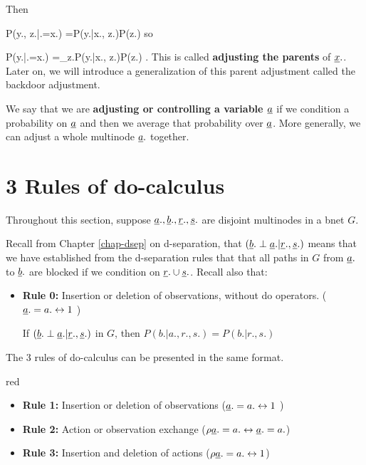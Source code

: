 Then

\beq
P(y., z.|\rho \rvx.=x.)
=P(y.|x., z.)P(z.)
\eeq
so

\beq
P(y.|\rho \rvx.=x.)
=\sum_{z.}P(y.|x., z.)P(z.)
\;.
\eeq
This is called
{\bf adjusting the parents}
of ${\underline{x}}.$.
Later on,
we will introduce 
a generalization
of 
this parent adjustment
called the 
backdoor adjustment.

We say that 
we are {\bf adjusting 
or controlling a variable ${\underline{a}}$}
if we condition 
a probability on ${\underline{a}}$ and 
then we average 
that probability over ${\underline{a}}$.
More generally, 
we can adjust a whole
multinode ${\underline{a}}.$ together.




\section*{3 Rules of do-calculus}
Throughout 
this section, suppose
${\underline{a}}., {\underline{b}}., {\underline{r}}., 
{\underline{s}}.$ are disjoint
multinodes in a bnet $G$.


Recall
from Chapter \ref{chap-dsep}
on d-separation,
that  $({\underline{b}}.\perp {\underline{a}}.|{\underline{r}}., {\underline{s}}.)$
means that 
we have established
from the d-separation
rules that 
that all 
paths in $G$
 from
${\underline{a}}.$ to
${\underline{b}}.$
are blocked
if we condition
on ${\underline{r}}.\cup {\underline{s}}.$.
Recall also that:

\begin{itemize}
\item {\bf Rule 0:} Insertion or
 deletion of
 observations, without
do operators.
(${\underline{a}}.=a. \leftrightarrow 1$ )


If 
 $({\underline{b}}.\perp {\underline{a}}.|{\underline{r}}., 
{\underline{s}}.)$ in $G$, then 
$P(b.|a., r., s.)=P(b.|r., s.)$
\end{itemize}

The 3 rules of do-calculus
can be presented in the same
format. 


\begin{color}{red}
\begin{itemize}
\item {\bf Rule 1:} 
Insertion or deletion of
 observations 
(${\underline{a}}.=a. \leftrightarrow 1$ )


\item {\bf Rule 2:} Action or 
observation exchange 
($\rho {\underline{a}}.=a. \leftrightarrow {\underline{a}}.=a.$)


\item {\bf Rule 3:} Insertion and
 deletion of actions
($\rho {\underline{a}}.=a. \leftrightarrow 1$)



\end{itemize}
\end{color}

